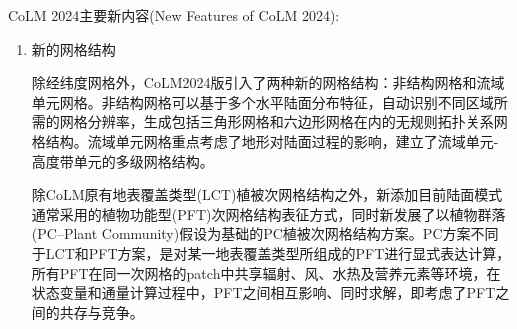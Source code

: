 CoLM 2024主要新内容(New Features of CoLM 2024):
\begin{enumerate}[label={\arabic*)}]
\item 新的网格结构

  除经纬度网格外，CoLM2024版引入了两种新的网格结构：非结构网格和流域单元网格。非结构网格可以基于多个水平陆面分布特征，自动识别不同区域所需的网格分辨率，生成包括三角形网格和六边形网格在内的无规则拓扑关系网格结构。流域单元网格重点考虑了地形对陆面过程的影响，建立了流域单元-高度带单元的多级网格结构。

  除CoLM原有地表覆盖类型(LCT)植被次网格结构之外，新添加目前陆面模式通常采用的植物功能型(PFT)次网格结构表征方式，同时新发展了以植物群落(PC--Plant Community)假设为基础的PC植被次网格结构方案。PC方案不同于LCT和PFT方案，是对某一地表覆盖类型所组成的PFT进行显式表达计算，所有PFT在同一次网格的patch中共享辐射、风、水热及营养元素等环境，在状态变量和通量计算过程中，PFT之间相互影响、同时求解，即考虑了PFT之间的共存与竞争。


\end{enumerate}
